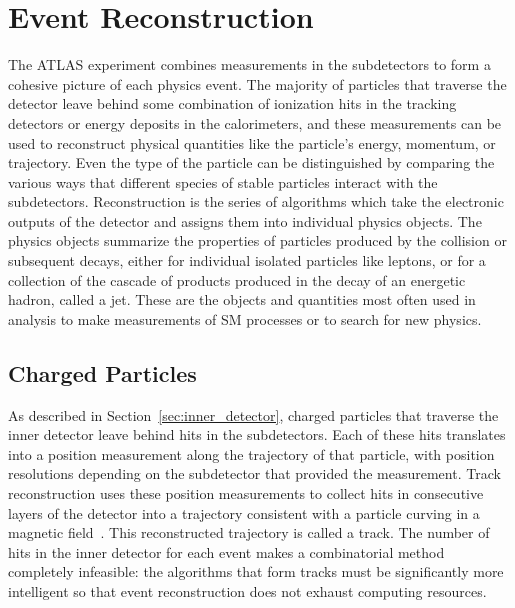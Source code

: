 \chapter{Event Reconstruction}

\label{ch:reconstruction}

The ATLAS experiment combines measurements in the subdetectors to form a cohesive picture of each physics event. 
The majority of particles that traverse the detector leave behind some combination of ionization hits in the tracking detectors or energy deposits in the calorimeters, and these measurements can be used to reconstruct physical quantities like the particle's energy, momentum, or trajectory.
Even the type of the particle can be distinguished by comparing the various ways that different species of stable particles interact with the subdetectors.
Reconstruction is the series of algorithms which take the electronic outputs of the detector and assigns them into individual physics objects.
The physics objects summarize the properties of particles produced by the collision or subsequent decays, either for individual isolated particles like leptons, or for a collection of the cascade of products produced in the decay of an energetic hadron, called a jet. 
These are the objects and quantities most often used in analysis to make measurements of \ac{SM} processes or to search for new physics.


\section{Charged Particles}
\label{sec:tracks}

As described in Section~\ref{sec:inner_detector}, charged particles that traverse the inner detector leave behind hits in the subdetectors.
Each of these hits translates into a position measurement along the trajectory of that particle, with position resolutions depending on the subdetector that provided the measurement. 
Track reconstruction uses these position measurements to collect hits in consecutive layers of the detector into a trajectory consistent with a particle curving in a magnetic field~\cite{newt, ATLAS-CONF-2012-042}.
This reconstructed trajectory is called a track.
The number of hits in the inner detector for each event makes a combinatorial method completely infeasible: the algorithms that form tracks must be significantly more intelligent so that event reconstruction does not exhaust computing resources.

